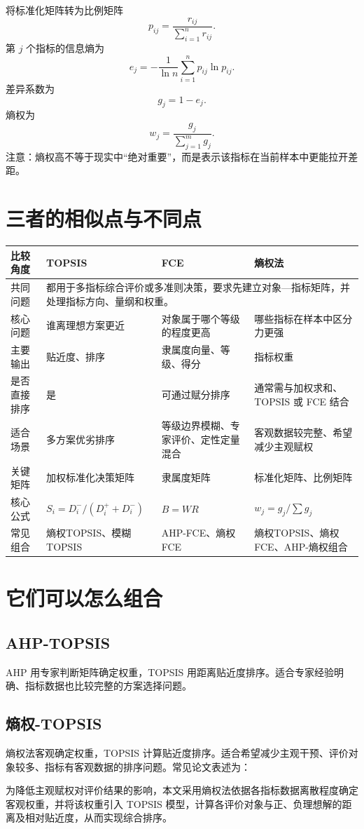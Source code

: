 \documentclass[UTF8,zihao=-4]{ctexart}
\begin{document}
将标准化矩阵转为比例矩阵
\[
p_{ij}=\frac{r_{ij}}{\sum_{i=1}^n r_{ij}}.
\]
第 $j$ 个指标的信息熵为
\[
e_j=-\frac{1}{\ln n}\sum_{i=1}^n p_{ij}\ln p_{ij}.
\]
差异系数为
\[
g_j=1-e_j.
\]
熵权为
\[
w_j=\frac{g_j}{\sum_{j=1}^m g_j}.
\]
注意：熵权高不等于现实中“绝对重要”，而是表示该指标在当前样本中更能拉开差距。

\section{三者的相似点与不同点}
\begin{longtable}{p{3cm}p{4.1cm}p{4.1cm}p{4.1cm}}
\toprule
比较角度 & TOPSIS & FCE & 熵权法 \\
\midrule
共同问题 & \multicolumn{3}{p{12.3cm}}{都用于多指标综合评价或多准则决策，要求先建立对象—指标矩阵，并处理指标方向、量纲和权重。} \\
核心问题 & 谁离理想方案更近 & 对象属于哪个等级的程度更高 & 哪些指标在样本中区分力更强 \\
主要输出 & 贴近度、排序 & 隶属度向量、等级、得分 & 指标权重 \\
是否直接排序 & 是 & 可通过赋分排序 & 通常需与加权求和、TOPSIS 或 FCE 结合 \\
适合场景 & 多方案优劣排序 & 等级边界模糊、专家评价、定性定量混合 & 客观数据较完整、希望减少主观赋权 \\
关键矩阵 & 加权标准化决策矩阵 & 隶属度矩阵 & 标准化矩阵、比例矩阵 \\
核心公式 & $S_i=D_i^-/(D_i^+ + D_i^-)$ & $B=WR$ & $w_j=g_j/\sum g_j$ \\
常见组合 & 熵权TOPSIS、模糊TOPSIS & AHP-FCE、熵权FCE & 熵权TOPSIS、熵权FCE、AHP-熵权组合 \\
\bottomrule
\end{longtable}

\section{它们可以怎么组合}
\subsection{AHP-TOPSIS}
AHP 用专家判断矩阵确定权重，TOPSIS 用距离贴近度排序。适合专家经验明确、指标数据也比较完整的方案选择问题。

\subsection{熵权-TOPSIS}
熵权法客观确定权重，TOPSIS 计算贴近度排序。适合希望减少主观干预、评价对象较多、指标有客观数据的排序问题。常见论文表述为：
\begin{tcolorbox}
为降低主观赋权对评价结果的影响，本文采用熵权法依据各指标数据离散程度确定客观权重，并将该权重引入 TOPSIS 模型，计算各评价对象与正、负理想解的距离及相对贴近度，从而实现综合排序。
\end{tcolorbox}
\end{document}
